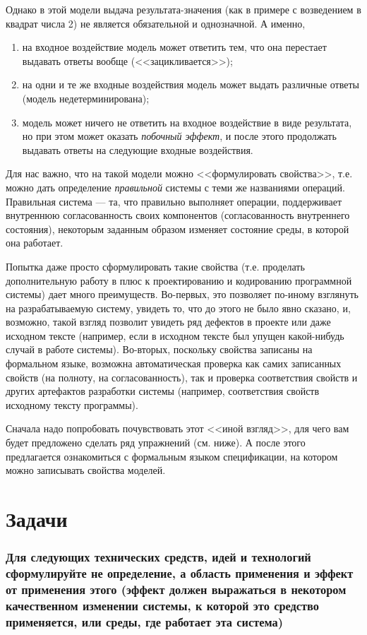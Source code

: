 \documentclass[14pt, twoside]{extreport}
\newcounter{problem_type}[chapter]
\newcommand{\head}[1]{\vspace{1cm}\subsubsection*{#1}}
\newcommand{\zhead}[1]{\head{#1} \refstepcounter{problem_type}}
\begin{document}
Однако в этой модели выдача результата-значения  (как в примере с возведением в квадрат числа 2) не является обязательной и однозначной. А именно,
\begin{enumerate}
	\item на входное воздействие модель может ответить тем, что она перестает выдавать ответы вообще (<<зацикливается>>);
	\item на одни и те же входные воздействия модель может выдать различные ответы (модель недетерминирована);
	\item модель может ничего не ответить на входное воздействие в виде результата, но при этом может оказать \emph{побочный эффект}, и после этого продолжать выдавать ответы на следующие входные воздействия.
\end{enumerate}

Для нас важно, что на такой модели можно <<формулировать свойства>>, т.е. можно дать определение \emph{правильной} системы с теми же названиями операций. Правильная система --- та, что правильно выполняет операции, поддерживает внутреннюю согласованность своих компонентов (согласованность внутреннего состояния), некоторым заданным образом изменяет состояние среды, в которой она работает.

Попытка даже просто сформулировать такие свойства (т.е. проделать дополнительную работу в плюс к проектированию и кодированию программной системы) дает много преимуществ. Во-первых, это позволяет по-иному взглянуть на разрабатываемую систему, увидеть то, что до этого не было явно сказано, и, возможно, такой взгляд позволит увидеть ряд дефектов в проекте или даже исходном тексте (например, если в исходном тексте был упущен какой-нибудь случай в работе системы). Во-вторых, поскольку свойства записаны на формальном языке, возможна автоматическая проверка как самих записанных свойств (на полноту, на согласованность), так и проверка соответствия свойств и других артефактов разработки системы (например, соответствия свойств исходному тексту программы).

Сначала надо попробовать почувствовать этот <<иной взгляд>>, для чего вам будет предложено сделать ряд упражнений (см. ниже). А после этого предлагается ознакомиться с формальным языком спецификации, на котором можно записывать свойства моделей.

\section*{Задачи}

\zhead{Для следующих технических средств, идей и технологий сформулируйте не определение, а область применения и эффект от применения этого (эффект должен выражаться в некотором качественном изменении системы, к которой это средство применяется, или среды, где работает эта система)}
\end{document}
